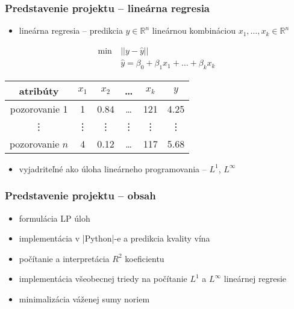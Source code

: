 \documentclass[presentation.tex]{subfiles}
\begin{document}
\begin{frame}

\frametitle{Predstavenie projektu -- lineárna regresia}
\begin{itemize}
	\item lineárna regresia -- predikcia $y \in \mathbb{R}^n$ lineárnou kombináciou $x_1,\dots,x_k \in \mathbb{R}^n$
\end{itemize}
\begin{align*}
	\min~&||y - \hat{y}|| \\
	&\hat{y} = \beta_0 + \beta_1x_1 + \dots + \beta_kx_k
\end{align*}

\begin{center}
	\small
	\begin{tabular}{| c || c | c | c | c | c |}
		\hline
		atribúty & $x_1$ & $x_2$ & \dots & $x_k$ & $y$ \\
		\hline
		pozorovanie 1 & 1 & 0.84 & \dots & 121 & 4.25 \\
		\hline
		\vdots & \vdots & \vdots & \vdots & \vdots & \vdots \\
		\hline
		pozorovanie $n$ & 4 & 0.12 & \dots & 117 & 5.68 \\
		\hline
	\end{tabular}
\end{center}

\begin{itemize}
	\item vyjadriteľné ako úloha lineárneho programovania -- $L^1$, $L^{\infty}$
\end{itemize}

\end{frame}

\begin{frame}
	\frametitle{Predstavenie projektu -- obsah}

\begin{itemize}
	\item formulácia LP úloh 
	\item implementácia v \pyth|Python|-e a predikcia kvality vína
	\item počítanie a interpretácia $R^2$ koeficientu
	\item implementácia všeobecnej triedy na počítanie $L^1$ a $L^{\infty}$ lineárnej regresie
	\item minimalizácia váženej sumy noriem
\end{itemize}

\end{frame}


	
\end{document}
